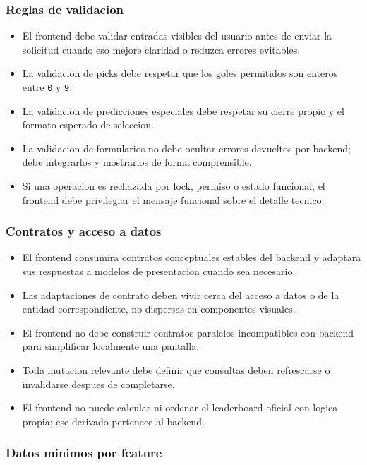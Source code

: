 \subsubsection{Reglas de validacion}

\begin{itemize}
  \item El frontend debe validar entradas visibles del usuario antes de enviar la solicitud cuando eso mejore claridad o reduzca errores evitables.
  \item La validacion de picks debe respetar que los goles permitidos son enteros entre \texttt{0} y \texttt{9}.
  \item La validacion de predicciones especiales debe respetar su cierre propio y el formato esperado de seleccion.
  \item La validacion de formularios no debe ocultar errores devueltos por backend; debe integrarlos y mostrarlos de forma comprensible.
  \item Si una operacion es rechazada por lock, permiso o estado funcional, el frontend debe privilegiar el mensaje funcional sobre el detalle tecnico.
\end{itemize}

\subsubsection{Contratos y acceso a datos}

\begin{itemize}
  \item El frontend consumira contratos conceptuales estables del backend y adaptara sus respuestas a modelos de presentacion cuando sea necesario.
  \item Las adaptaciones de contrato deben vivir cerca del acceso a datos o de la entidad correspondiente, no dispersas en componentes visuales.
  \item El frontend no debe construir contratos paralelos incompatibles con backend para simplificar localmente una pantalla.
  \item Toda mutacion relevante debe definir que consultas deben refrescarse o invalidarse despues de completarse.
  \item El frontend no puede calcular ni ordenar el leaderboard oficial con logica propia; ese derivado pertenece al backend.
\end{itemize}

\subsubsection{Datos minimos por feature}

